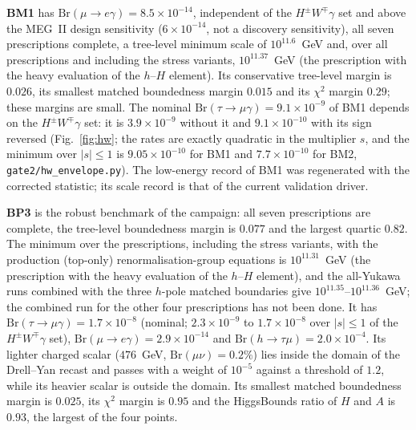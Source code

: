 \documentclass[twocolumn,epjc3]{svjour3}
\newcommand{\Br}{\mathrm{Br}}
\begin{document}
\textbf{BM1} has $\Br(\mu\to e\gamma)=8.5\times10^{-14}$, independent of the $H^\pm W^\mp\gamma$ set and above the MEG~II design sensitivity ($6\times10^{-14}$, not a discovery sensitivity), all seven prescriptions complete, a tree-level minimum scale of $10^{11.6}$~GeV and, over all prescriptions and including the stress variants, $10^{11.37}$~GeV (the prescription with the heavy evaluation of the $h$--$H$ element). Its conservative tree-level margin is $0.026$, its smallest matched boundedness margin $0.015$ and its $\chi^2$ margin $0.29$; these margins are small. The nominal $\Br(\tau\to\mu\gamma)=9.1\times10^{-9}$ of BM1 depends on the $H^\pm W^\mp\gamma$ set: it is $3.9\times10^{-9}$ without it and $9.1\times10^{-10}$ with its sign reversed (Fig.~\ref{fig:hw}; the rates are exactly quadratic in the multiplier $s$, and the minimum over $|s|\le1$ is $9.05\times10^{-10}$ for BM1 and $7.7\times10^{-10}$ for BM2, \texttt{gate2/hw\_envelope.py}). The low-energy record of BM1 was regenerated with the corrected statistic; its scale record is that of the current validation driver.

\textbf{BP3} is the robust benchmark of the campaign: all seven prescriptions are complete, the tree-level boundedness margin is $0.077$ and the largest quartic $0.82$. The minimum over the prescriptions, including the stress variants, with the production (top-only) renormalisation-group equations is $10^{11.31}$~GeV (the prescription with the heavy evaluation of the $h$--$H$ element), and the all-Yukawa runs combined with the three $h$-pole matched boundaries give $10^{11.35}$--$10^{11.36}$~GeV; the combined run for the other four prescriptions has not been done. It has $\Br(\tau\to\mu\gamma)=1.7\times10^{-8}$ (nominal; $2.3\times10^{-9}$ to $1.7\times10^{-8}$ over $|s|\le1$ of the $H^\pm W^\mp\gamma$ set), $\Br(\mu\to e\gamma)=2.9\times10^{-14}$ and $\Br(h\to\tau\mu)=2.0\times10^{-4}$. Its lighter charged scalar ($476$~GeV, $\Br(\mu\nu)=0.2\%$) lies inside the domain of the Drell--Yan recast and passes with a weight of $10^{-5}$ against a threshold of $1.2$, while its heavier scalar is outside the domain. Its smallest matched boundedness margin is $0.025$, its $\chi^2$ margin is $0.95$ and the HiggsBounds ratio of $H$ and $A$ is $0.93$, the largest of the four points.
\end{document}
